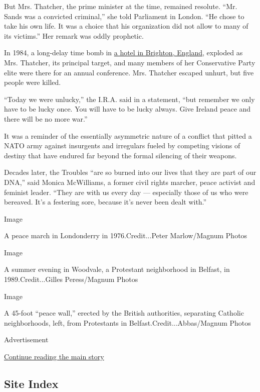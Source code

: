 But Mrs. Thatcher, the prime minister at the time, remained resolute.
``Mr. Sands was a convicted criminal,'' she told Parliament in London.
``He chose to take his own life. It was a choice that his organization
did not allow to many of its victims.'' Her remark was oddly prophetic.

In 1984, a long-delay time bomb in
\href{https://www.nytimes.com/1984/10/13/world/ira-says-it-set-bomb-that-ripped-thatcher-s-hotel.html}{a
hotel in Brighton, England}, exploded as Mrs. Thatcher, its principal
target, and many members of her Conservative Party elite were there for
an annual conference. Mrs. Thatcher escaped unhurt, but five people were
killed.

``Today we were unlucky,'' the I.R.A. said in a statement, ``but
remember we only have to be lucky once. You will have to be lucky
always. Give Ireland peace and there will be no more war.''

It was a reminder of the essentially asymmetric nature of a conflict
that pitted a NATO army against insurgents and irregulars fueled by
competing visions of destiny that have endured far beyond the formal
silencing of their weapons.

Decades later, the Troubles ``are so burned into our lives that they are
part of our DNA,'' said Monica McWilliams, a former civil rights
marcher, peace activist and feminist leader. ``They are with us every
day --- especially those of us who were bereaved. It's a festering sore,
because it's never been dealt with.''

Image

A peace march in Londonderry in 1976.Credit...Peter Marlow/Magnum Photos

Image

A summer evening in Woodvale, a Protestant neighborhood in Belfast, in
1989.Credit...Gilles Peress/Magnum Photos

Image

A 45-foot ``peace wall,'' erected by the British authorities, separating
Catholic neighborhoods, left, from Protestants in
Belfast.Credit...Abbas/Magnum Photos

Advertisement

\protect\hyperlink{after-bottom}{Continue reading the main story}

\hypertarget{site-index}{%
\subsection{Site Index}\label{site-index}}

